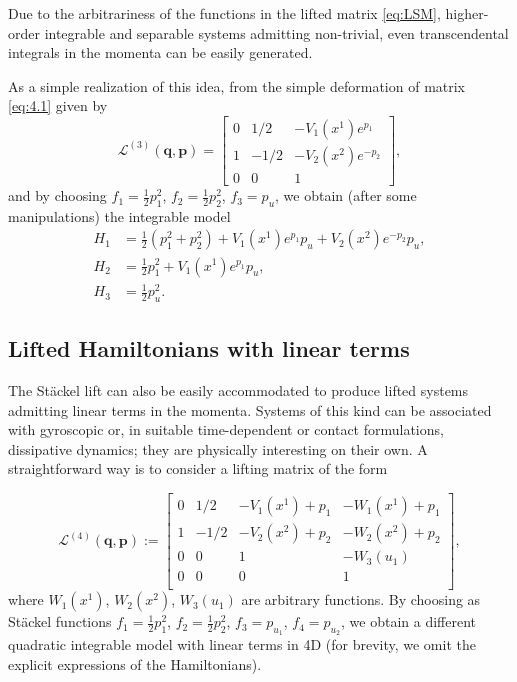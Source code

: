 \documentclass[10pt]{amsart}
\numberwithin{equation}{section}
\newcommand{\bs}{\boldsymbol}
\theoremstyle{definition}
\begin{document}
	Due to the arbitrariness of the functions in the lifted matrix \eqref{eq:LSM}, higher-order integrable and separable systems admitting non-trivial, even transcendental integrals in the momenta can be easily generated.
	
	As a simple realization of this idea, from the simple deformation of matrix \eqref{eq:4.1} given by 
	\begin{equation} \label{eq:6.2}
		\mathcal{L}^{(3)}(\bs{q},\bs{p})=
		\begin{bmatrix}
			0 & 1/2 & -V_1(x^1) e^{p_1} \\ 1 & -1/2 & -V_2(x^2)e^{-p_2} \\ 0 & 0 & 1
		\end{bmatrix},
	\end{equation}
	and by choosing $f_1=\frac{1}{2}p^{2}_{1}$, $f_2=\frac{1}{2}p^{2}_{2}$, $f_3= p_u$, 
	we obtain (after some manipulations) the integrable model 
	\begin{equation}
		\begin{split}
			H_1 &= \frac{1}{2}(p_1^2+p_2^2) + V_1(x^1) e^{p_1} p_u+ V_2(x^2) e^{-p_2} p_u, \\ 
			H_2 &= \frac{1}{2} p_1^2 + V_1(x^1) e^{p_1} p_u, \\
			H_3 &= \frac{1}{2} p_u^2.
		\end{split}
	\end{equation}
	
	
	\subsection{Lifted Hamiltonians with linear terms}
	
	The St\"ackel lift can also be easily accommodated to produce lifted systems admitting linear terms in the momenta. Systems of this kind can be associated with gyroscopic or, in suitable time-dependent or contact formulations, dissipative dynamics; they are physically interesting on their own.
	A straightforward way is to consider a lifting matrix of the form
	
	
	\begin{equation}
		\mathcal{L}^{(4)}(\bs{q},\bs{p}):=
		\begin{bmatrix}
			0 & 1/2 & -V_1(x^1)+ p_1 & -W_{1}(x^1)+ p_1 \\ 1 & -1/2 & -V_2(x^2)+ p_2 & -W_{2}(x^2)+ p_2 \\ 0 & 0 & 1 & -W_{3}(u_1) \\ 0 & 0 & 0 & 1 \\
		\end{bmatrix},
	\end{equation}
	where $W_{1}(x^1)$, $W_{2}(x^2)$, $W_{3}(u_1)$ are arbitrary functions. 
	By choosing as St\"ackel functions $f_1= \frac{1}{2}p_1^2$, $f_2=\frac{1}{2}p_2^2$, $f_3= p_{u_1}$, $f_4= p_{u_2}$, we obtain a different quadratic integrable model with linear terms in 4D (for brevity, we omit the explicit expressions of the Hamiltonians).
\end{document}

